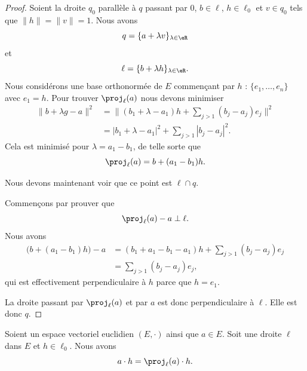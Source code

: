 \begin{proof}
	Soient la droite \( q_0\) parallèle à \( q\) passant par \( 0\), \( b\in\ell\), \( h\in\ell_0\) et \( v\in q_0\) tels que \( \| h \|=\| v \|=1\). Nous avons
	\begin{equation}
		q=\{ a+\lambda v \}_{\lambda\in \eR}
	\end{equation}
	et
	\begin{equation}
		\ell=\{ b+\lambda h \}_{\lambda\in \eR}.
	\end{equation}
	Nous considérons une base orthonormée de \( E\) commençant par \( h\) : \( \{ e_1,\ldots,e_n \}\) avec \( e_1=h\). Pour trouver \( \proj_{\ell}(a)\) nous devons minimiser
	\begin{subequations}
		\begin{align}
			\| b+\lambda g-a \|^2 & =\| (b_1+\lambda -a_1)h+\sum_{j>1}(b_j-a_j)e_j \|^2 \\
			                      & =| b_1+\lambda-a_1 |^2+\sum_{j>1}| b_j-a_j |^2.
		\end{align}
	\end{subequations}
	Cela est minimisé pour \( \lambda=a_1-b_1\), de telle sorte que
	\begin{equation}
		\proj_{\ell}(a)=b+(a_1-b_1)h.
	\end{equation}

	Nous devons maintenant voir que ce point est \( \ell\cap q\).

	Commençons par prouver que
	\begin{equation}
		\proj_{\ell}(a)-a\perp\ell.
	\end{equation}
	Nous avons
	\begin{subequations}
		\begin{align}
			\big( b+(a_1-b_1)h \big)-a & =(b_1+a_1-b_1-a_1)h+\sum_{j>1}(b_j-a_j)e_j \\
			                           & =\sum_{j>1}(b_j-a_j)e_j,
		\end{align}
	\end{subequations}
	qui est effectivement perpendiculaire à \( h\) parce que \( h=e_1\).

	La droite passant par \( \proj_{\ell}(a)\) et par \( a\) est donc perpendiculaire à \( \ell\). Elle est donc \( q\).
\end{proof}


\begin{lemma}       \label{LEMooXZMFooOPTjNx}
	Soient un espace vectoriel euclidien \( (E,\cdot)\) ainsi que \( a\in E\). Soit une droite \( \ell\) dans \( E\) et \( h\in \ell_0\). Nous avons
	\begin{equation}
		a\cdot h=\proj_{\ell}(a)\cdot h.
	\end{equation}
\end{lemma}

